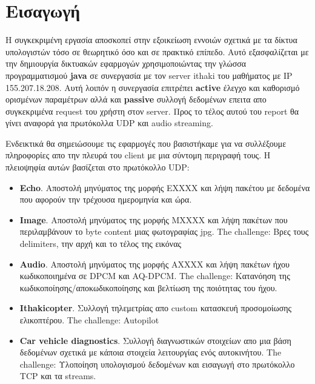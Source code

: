 \documentclass[hidelinks, 12pt, a4paper]{article}
\begin{document}
\sloppy %




\pagebreak
\tableofcontents
\pagebreak



\section{Εισαγωγή}

Η συγκεκριμένη εργασία αποσκοπεί στην εξοικείωση εννοιών σχετικά με τα δίκτυα υπολογιστών τόσο σε θεωρητικό όσο και σε πρακτικό επίπεδο. Αυτό εξασφαλίζεται με την δημιουργία δικτυακών εφαρμογών χρησιμοποιώντας την γλώσσα προγραμματισμού \textbf{java} σε συνεργασία με τον server ithaki του μαθήματος με IP 155.207.18.208. Αυτή λοιπόν η συνεργασία επιτρέπει \textbf{active} έλεγχο και καθορισμό ορισμένων παραμέτρων αλλά και \textbf{passive} συλλογή δεδομένων επειτα απο συγκεκριμένα request του χρήστη στον server. Προς το τέλος αυτού του report θα γίνει αναφορά για πρωτόκολλα UDP και audio streaming.

Ενδεικτικά θα σημειώσουμε τις εφαρμογές που βασιστήκαμε για να συλλέξουμε πληροφορίες απο την πλευρά του client με μια σύντομη περιγραφή τους. Η πλειοψηφία αυτών βασίζεται στο πρωτόκολλο UDP:
\begin{itemize}
    \item \textbf{Echo}.
        Αποστολή μηνύματος της μορφής ΕΧΧΧX και λήψη πακέτου με δεδομένα που αφορούν την τρέχουσα ημερομηνία και ώρα.
    \item \textbf{Image}.
        Αποστολή μηνύματος της μορφής ΜΧΧΧΧ και λήψη πακέτων που περιλαμβάνουν το byte content μιας φωτογραφίας jpg. The challenge: Βρες τους delimiters, την αρχή και το τέλος της εικόνας 
    \item \textbf{Audio}.
        Αποστολή μηνύματος της μορφής ΑΧΧΧΧ και λήψη πακέτων ήχου κωδικοποιημένα σε DPCM και AQ-DPCM. The challenge: Κατανόηση της κωδικοποίησης/αποκωδικοποίησης και βελτίωση της ποιότητας του ήχου.
    \item \textbf{Ithakicopter}. Συλλογή τηλεμετρίας απο custom κατασκευή προσομοίωσης ελικοπτέρου. The challenge: Autopilot
    \item \textbf{Car vehicle diagnostics}. Συλλογή διαγνωστικών στοιχείων απο μια βάση δεδομένων σχετικά με κάποια στοιχεία λειτουργίας ενός αυτοκινήτου. The challenge: Υλοποίηση υπολογισμού δεδομένων και εισαγωγή στο πρωτόκολλο TCP και τα streams.
\end{itemize}
\end{document}
